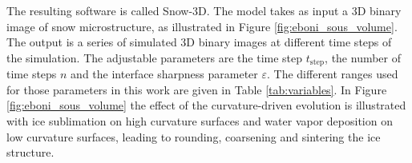 \documentclass[draft,ms]{agujournal2019}
\begin{document}
%
%


The resulting software is called Snow-3D. The model takes as input a 3D binary image of snow microstructure, as illustrated in Figure \ref{fig:eboni_sous_volume}. The output is a series of simulated 3D binary images at different time steps of the simulation. The adjustable parameters are the time step $t_{\mathrm{step}}$, the number of time steps $n$ and the interface sharpness parameter $\varepsilon$. The different ranges used for those parameters in this work are given in Table \ref{tab:variables}. In Figure \ref{fig:eboni_sous_volume} the effect of the curvature-driven evolution is illustrated with ice sublimation on high curvature surfaces and water vapor deposition on low curvature surfaces, leading to rounding, coarsening and sintering the ice structure.
\end{document}
